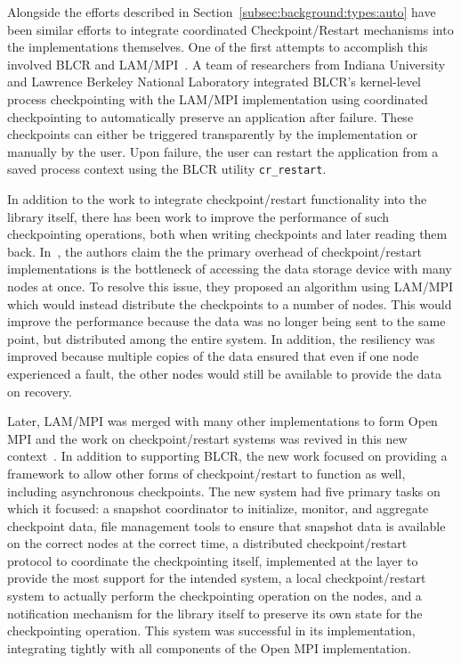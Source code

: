 Alongside the efforts described in Section~\ref{subsec:background:types:auto} have been 
similar efforts to integrate coordinated Checkpoint/Restart mechanisms into the \mpi 
implementations themselves. One of the first attempts to accomplish this involved BLCR 
and LAM/MPI~\cite{Sankaran:2005el}. A team of researchers from Indiana University and 
Lawrence Berkeley National Laboratory integrated BLCR's kernel-level process 
checkpointing with the LAM/MPI implementation using coordinated checkpointing to 
automatically preserve an application after failure. These checkpoints can either be 
triggered transparently by the \mpi implementation or manually by the user. Upon 
failure, the user can restart the application from a saved process context using the 
BLCR utility \texttt{cr\_restart}.

In addition to the work to integrate checkpoint/restart functionality into the \mpi 
library itself, there has been work to improve the performance of such checkpointing 
operations, both when writing checkpoints and later reading them back. 
In~\cite{Walters:gd}, the authors claim the the primary overhead of checkpoint/restart 
implementations is the bottleneck of accessing the data storage device with many nodes 
at once. To resolve this issue, they proposed an algorithm using LAM/MPI which would 
instead distribute the checkpoints to a number of nodes. This would improve the 
performance because the data was no longer being sent to the same point, but 
distributed among the entire system. In addition, the resiliency was improved because 
multiple copies of the data ensured that even if one node experienced a fault, the 
other nodes would still be available to provide the data on recovery.

Later, LAM/MPI was merged with many other \mpi implementations to form Open MPI and the 
work on checkpoint/restart systems was revived in this new 
context~\cite{Hursey:2007wp}. In addition to supporting BLCR, the new work focused on 
providing a framework to allow other forms of checkpoint/restart to function as well, 
including asynchronous checkpoints. The new system had five primary tasks on which it 
focused: a snapshot coordinator to initialize, monitor, and aggregate checkpoint data, 
file management tools to ensure that snapshot data is available on the correct nodes at 
the correct time, a distributed checkpoint/restart protocol to coordinate the 
checkpointing itself, implemented at the \mpi layer to provide the most support for the 
intended system, a local checkpoint/restart system to actually perform the 
checkpointing operation on the nodes, and a notification mechanism for the \mpi library 
itself to preserve its own state for the checkpointing operation. 
This system was successful in its implementation, integrating tightly with all 
components of the Open MPI implementation.


